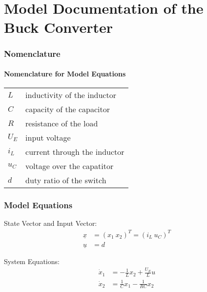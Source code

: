 \documentclass[10pt,a4paper]{article}
\begin{document}
	\part*{Model Documentation of the \\ Buck Converter} %
	
	
	\section{Nomenclature} %
	\subsection{Nomenclature for Model Equations} %
	
	\begin{tabular}{ll}
		$L$ & inductivity of the inductor \\
		$C$ & capacity of the capacitor \\
		$R$ & resistance of the load \\
		$U_E$ & input voltage \\
		$i_L$ & current through the inductor \\
		$u_C$ & voltage over the capatitor \\
		$d$ & duty ratio of the switch \\

		
				
	\end{tabular}
	 
	
	
	\section{Model Equations} %
	
	State Vector and Input Vector:
	\begin{align*}
		\underline{x} &= (x_1 \ x_2)^T = (i_L \ u_C)^T \\
		\underline{u} &= d
	\end{align*}
	
	\noindent System Equations:			
	\begin{subequations}
	\begin{align}
		\dot{x}_1 &= - \frac{1}{L}x_2+\frac{U_E}{L}u \\
		\dot{x}_2 &= \frac{1}{C}x_1 - \frac{1}{RC}x_2
	\end{align}
	\end{subequations}
\end{document}
